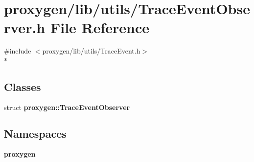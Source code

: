 \section{proxygen/lib/utils/\+Trace\+Event\+Observer.h File Reference}
\label{TraceEventObserver_8h}
{\ttfamily \#include $<$proxygen/lib/utils/\+Trace\+Event.\+h$>$}\\*
\subsection*{Classes}
\begin{DoxyCompactItemize}
\item 
struct {\bf proxygen\+::\+Trace\+Event\+Observer}
\end{DoxyCompactItemize}
\subsection*{Namespaces}
\begin{DoxyCompactItemize}
\item 
 {\bf proxygen}
\end{DoxyCompactItemize}

